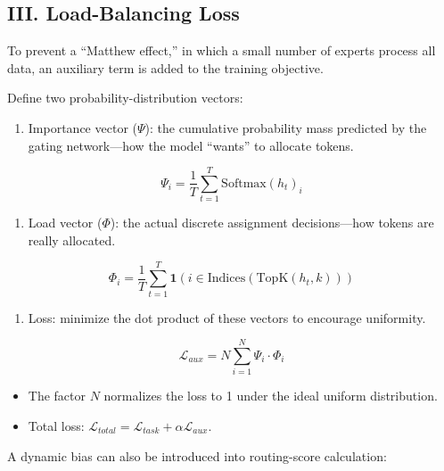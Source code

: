 \hypertarget{iii.-load-balancing-loss}{%
\subsection{III. Load-Balancing Loss}\label{iii.-load-balancing-loss}}

To prevent a ``Matthew effect,'' in which a small number of experts process all data, an auxiliary term is added to the training objective.

Define two probability-distribution vectors:

\begin{enumerate}
\def\labelenumi{\arabic{enumi}.}
\tightlist
\item
  Importance vector (\(\Psi\)): the cumulative probability mass predicted by the gating network---how the model ``wants'' to allocate tokens.
\end{enumerate}

\[
\Psi_i = \frac{1}{T}\sum_{t=1}^{T}\mathrm{Softmax}(h_t)_i
\]

\begin{enumerate}
\def\labelenumi{\arabic{enumi}.}
\setcounter{enumi}{1}
\tightlist
\item
  Load vector (\(\Phi\)): the actual discrete assignment decisions---how tokens are really allocated.
\end{enumerate}

\[
\Phi_i = \frac{1}{T}\sum_{t=1}^{T}\mathbf{1}\left(i \in \mathrm{Indices}(\mathrm{TopK}(h_t,k))\right)
\]

\begin{enumerate}
\def\labelenumi{\arabic{enumi}.}
\setcounter{enumi}{2}
\tightlist
\item
  Loss: minimize the dot product of these vectors to encourage uniformity.
\end{enumerate}

\[
\mathcal{L}_{aux} = N\sum_{i=1}^{N}\Psi_i \cdot \Phi_i
\]

\begin{itemize}
\tightlist
\item
  The factor \(N\) normalizes the loss to 1 under the ideal uniform distribution.
\item
  Total loss: \(\mathcal{L}_{total}=\mathcal{L}_{task}+\alpha\mathcal{L}_{aux}\).
\end{itemize}

A dynamic bias can also be introduced into routing-score calculation:

